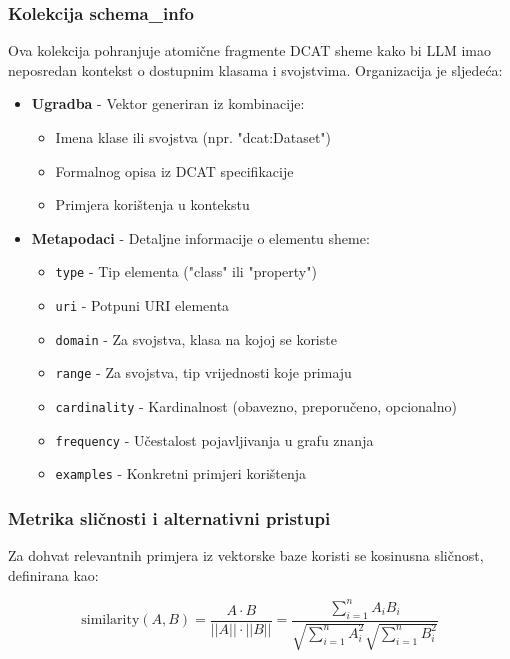 \subsubsection{Kolekcija schema\_info}

Ova kolekcija pohranjuje atomične fragmente DCAT sheme kako bi LLM imao neposredan kontekst o dostupnim klasama i svojstvima. Organizacija je sljedeća:

\begin{itemize}
    \item \textbf{Ugradba} - Vektor generiran iz kombinacije:
    \begin{itemize}
        \item Imena klase ili svojstva (npr. "dcat:Dataset")
        \item Formalnog opisa iz DCAT specifikacije
        \item Primjera korištenja u kontekstu
    \end{itemize}
    
    \item \textbf{Metapodaci} - Detaljne informacije o elementu sheme:
    \begin{itemize}
        \item \texttt{type} - Tip elementa ("class" ili "property")
        \item \texttt{uri} - Potpuni URI elementa
        \item \texttt{domain} - Za svojstva, klasa na kojoj se koriste
        \item \texttt{range} - Za svojstva, tip vrijednosti koje primaju
        \item \texttt{cardinality} - Kardinalnost (obavezno, preporučeno, opcionalno)
        \item \texttt{frequency} - Učestalost pojavljivanja u grafu znanja
        \item \texttt{examples} - Konkretni primjeri korištenja
    \end{itemize}
\end{itemize}

\subsubsection{Metrika sličnosti i alternativni pristupi}

Za dohvat relevantnih primjera iz vektorske baze koristi se kosinusna sličnost, definirana kao:

$$\text{similarity}(A, B) = \frac{A \cdot B}{||A|| \cdot ||B||} = \frac{\sum_{i=1}^{n} A_i B_i}{\sqrt{\sum_{i=1}^{n} A_i^2} \sqrt{\sum_{i=1}^{n} B_i^2}}$$

